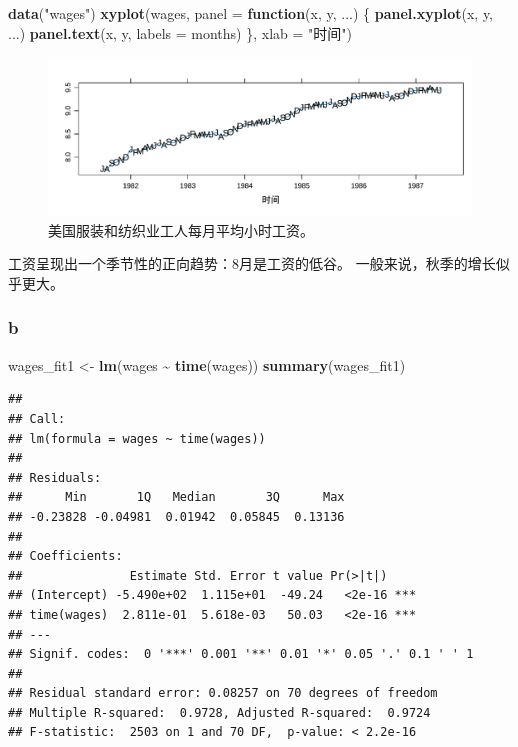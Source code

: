 \documentclass[
]{article}
\newenvironment{Shaded}{\begin{snugshade}}{\end{snugshade}}
\newcommand{\AttributeTok}[1]{\textcolor[rgb]{0.13,0.29,0.53}{#1}}
\newcommand{\ControlFlowTok}[1]{\textcolor[rgb]{0.13,0.29,0.53}{\textbf{#1}}}
\newcommand{\FunctionTok}[1]{\textcolor[rgb]{0.13,0.29,0.53}{\textbf{#1}}}
\newcommand{\NormalTok}[1]{#1}
\newcommand{\OtherTok}[1]{\textcolor[rgb]{0.56,0.35,0.01}{#1}}
\newcommand{\SpecialCharTok}[1]{\textcolor[rgb]{0.81,0.36,0.00}{\textbf{#1}}}
\newcommand{\StringTok}[1]{\textcolor[rgb]{0.31,0.60,0.02}{#1}}
\begin{document}
\begin{Shaded}
\begin{Highlighting}[]
\FunctionTok{data}\NormalTok{(}\StringTok{"wages"}\NormalTok{)}
\FunctionTok{xyplot}\NormalTok{(wages, }\AttributeTok{panel =} \ControlFlowTok{function}\NormalTok{(x, y, ...) \{}
  \FunctionTok{panel.xyplot}\NormalTok{(x, y, ...)}
  \FunctionTok{panel.text}\NormalTok{(x, y, }\AttributeTok{labels =}\NormalTok{ months)}
\NormalTok{\}, }\AttributeTok{xlab =} \StringTok{"时间"}\NormalTok{)}
\end{Highlighting}
\end{Shaded}

\begin{figure}
\centering
\includegraphics{chapter3_files/figure-latex/unnamed-chunk-3-1.pdf}
\caption{\label{fig:unnamed-chunk-3}美国服装和纺织业工人每月平均小时工资。}
\end{figure}

工资呈现出一个季节性的正向趋势：8月是工资的低谷。
一般来说，秋季的增长似乎更大。

\hypertarget{b-1}{%
\subsubsection*{b}\label{b-1}}

\begin{Shaded}
\begin{Highlighting}[]
\NormalTok{wages\_fit1 }\OtherTok{\textless{}{-}} \FunctionTok{lm}\NormalTok{(wages }\SpecialCharTok{\textasciitilde{}} \FunctionTok{time}\NormalTok{(wages))}
\FunctionTok{summary}\NormalTok{(wages\_fit1)}
\end{Highlighting}
\end{Shaded}

\begin{verbatim}
## 
## Call:
## lm(formula = wages ~ time(wages))
## 
## Residuals:
##      Min       1Q   Median       3Q      Max 
## -0.23828 -0.04981  0.01942  0.05845  0.13136 
## 
## Coefficients:
##               Estimate Std. Error t value Pr(>|t|)    
## (Intercept) -5.490e+02  1.115e+01  -49.24   <2e-16 ***
## time(wages)  2.811e-01  5.618e-03   50.03   <2e-16 ***
## ---
## Signif. codes:  0 '***' 0.001 '**' 0.01 '*' 0.05 '.' 0.1 ' ' 1
## 
## Residual standard error: 0.08257 on 70 degrees of freedom
## Multiple R-squared:  0.9728, Adjusted R-squared:  0.9724 
## F-statistic:  2503 on 1 and 70 DF,  p-value: < 2.2e-16
\end{verbatim}
\end{document}
